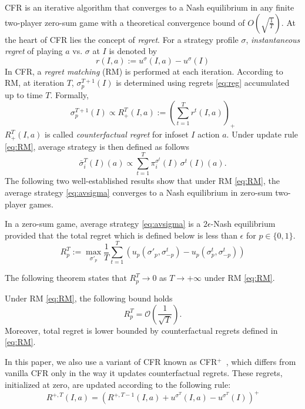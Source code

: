 CFR is an iterative algorithm that converges to a Nash equilibrium in any finite two-player zero-sum game with a theoretical convergence bound of \( O\left( \sqrt{\frac{1}{T}} \right) \). 
At the heart of CFR lies the concept of \textit{regret}. For a strategy profile $\sigma$, \textit{instantaneous regret} of playing $a$ vs. $\sigma$ at $I$ is denoted by 
\begin{equation}\label{eq:reg}
    r(I,a) := u^{\sigma}(I,a)-u^{\sigma}(I)
\end{equation}
In CFR, a \textit{regret matching} (RM) is performed at each iteration. According to RM, at iteration $T$, $\sigma^{T+1}_p(I)$  is determined using regrets \eqref{eq:reg} accumulated up to time $T$. Formally, 
\begin{equation}\label{eq:RM}
    \sigma^{T+1}_p(I) \propto R^T_+(I,a):= \left(\sum_{t=1}^T r^t(I,a)\right)_+
\end{equation}
$R^T_+(I,a)$ is called \textit{counterfactual regret} for infoset $I$ action $a$. Under update rule \eqref{eq:RM}, average strategy is then defined as follows
\begin{equation}\label{eq:avsigma}
\bar{\sigma}_i^T(I)(a) \propto \sum_{t=1}^{T} \pi_i^{\sigma^t}(I) \, \sigma^t(I)(a).
\end{equation}
The following two well-established results show that under RM \eqref{eq:RM}, the average strategy \eqref{eq:avsigma} converges to a Nash equilibrium in zero-sum two-player games. 
\begin{theorem}\label{thm:avst}
    In a zero-sum game, average strategy \eqref{eq:avsigma} is a $2\epsilon$-Nash equilibrium provided that the total regret which is defined below is less than $\epsilon$ for $p\in \{0,1\}$.
    \[R^T_p:=\max_{\sigma'_p}\frac{1}{T}\sum_{t=1}^T\left(u_p(\sigma'_p,\sigma_{-p}^t)-u_p(\sigma_p^t,\sigma^t_{-p})\right)\]
\end{theorem}
The following theorem states that $R_p^T \to 0$ as $T\to +\infty$ under RM \eqref{eq:RM}.
\begin{theorem}\label{thm:rm}
    Under RM \eqref{eq:RM}, the following bound holds 
    \[
    R_p^T = \mathcal{O}\left(\frac{1}{\sqrt{T}}\right).
    \]
    Moreover, total regret is lower bounded by counterfactual regrets defined in \eqref{eq:RM}.
\end{theorem}

In this paper, we also use a variant of CFR known as CFR$^+$~\cite{tammelin2014solving}, which differs from vanilla CFR only in the way it updates counterfactual regrets. These regrets, initialized at zero, are updated according to the following rule:
\begin{equation}
R^{+,T}(I, a) = \left( R^{+,T-1}(I, a) + u^{\sigma^T}(I, a) - u^{\sigma^T}(I) \right)^+
\end{equation}
